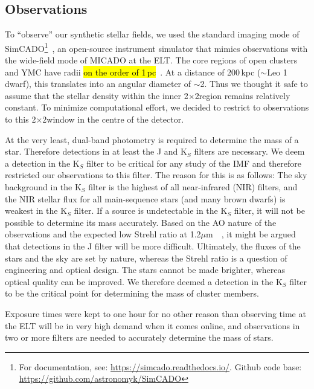 \documentclass{aa}
\newcommand{\um}{$\mu$m~}
\newcommand{\s}{$\sim$}
\begin{document}
\subsection{Observations}
\label{sec:telescope}

To ``observe'' our synthetic stellar fields, we used the standard imaging mode of SimCADO\footnote{For documentation, see: \url{https://simcado.readthedocs.io/}.
Github code base: \url{https://github.com/astronomyk/SimCADO}}~\citep{leschinski2016}, an open-source instrument simulator that mimics observations with the wide-field mode of MICADO at the ELT\@.
The core regions of open clusters and YMC have radii \hl{on the order of 1\,pc}~\citep{portegies2010}.
At a distance of 200\,kpc ($\sim$Leo 1 dwarf), this translates into an angular diameter of \s2\arcsec.
Thus we thought it safe to assume that the stellar density within the inner 2\arcsec$\times$2\arcsec region remains relatively constant.
To minimize computational effort, we decided to restrict to observations to this 2\arcsec$\times$2\arcsec window in the centre of the detector.

At the very least, dual-band photometry is required to determine the mass of a star.
Therefore detections in at least the J and K$_S$ filters are necessary.
We deem a detection in the K$_S$ filter to be critical for any study of the IMF and therefore restricted our observations to this filter.
The reason for this is as follows: The sky background in the K$_S$ filter is the highest of all near-infrared (NIR) filters, and the NIR stellar flux for all main-sequence stars (and many brown dwarfs) is weakest in the K$_S$ filter.
If a source is undetectable in the K$_S$ filter, it will not be possible to determine its mass accurately.
Based on the AO nature of the observations and the expected low Strehl ratio at 1.2\um~\citep{clenet2016}, it might be argued that detections in the J filter will be more difficult.
Ultimately, the fluxes of the stars and the sky are set by nature, whereas the Strehl ratio is a question of engineering and optical design.
The stars cannot be made brighter, whereas optical quality can be improved.
We therefore deemed a detection in the K$_S$ filter to be the critical point for determining the mass of cluster members.

Exposure times were kept to one hour for no other reason than observing time at the ELT will be in very high demand when it comes online, and observations in two or more filters are needed to accurately determine the mass of stars.
\end{document}
